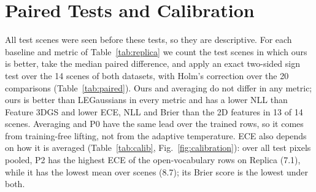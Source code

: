 \documentclass[journal]{IEEEtran}
\begin{document}
\section{Paired Tests and Calibration}
\label{supp:stats}
All test scenes were seen before these tests, so they are descriptive. For each baseline and metric of Table~\ref{tab:replica} we count the test scenes in which ours is better, take the median paired difference, and apply an exact two-sided sign test over the 14 scenes of both datasets, with Holm's correction over the 20 comparisons (Table~\ref{tab:paired}). Ours and averaging do not differ in any metric; ours is better than LEGaussians in every metric and has a lower NLL than Feature 3DGS and lower ECE, NLL and Brier than the 2D features in 13 of 14 scenes. Averaging and P0 have the same lead over the trained rows, so it comes from training-free lifting, not from the adaptive temperature. ECE also depends on how it is averaged (Table~\ref{tab:calib}, Fig.~\ref{fig:calibration}): over all test pixels pooled, P2 has the highest ECE of the open-vocabulary rows on Replica (7.1), while it has the lowest mean over scenes (8.7); its Brier score is the lowest under both.
\end{document}
